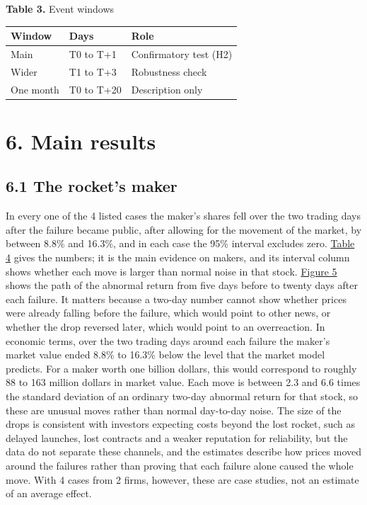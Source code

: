 \documentclass[12pt,a4paper]{article}
\begin{document}
\par\noindent\begin{minipage}{\textwidth}\hypertarget{tab-win}{}
\textbf{Table 3.} Event windows

{\small\setlength{\tabcolsep}{4pt}\begin{tabularx}{\textwidth}{llX}
\toprule
\textbf{Window} & \textbf{Days} & \textbf{Role} \\
\midrule
Main & T0 to T+1 & Confirmatory test (H2) \\
Wider & T\textminus{}1 to T+3 & Robustness check \\
One month & T0 to T+20 & Description only \\
\bottomrule
\end{tabularx}}
\vspace{6pt}

\end{minipage}\par\vspace{4pt}

\section*{\hypertarget{s6}{}6. Main results}
\subsection*{6.1 The rocket's maker}
In every one of the 4 listed cases the maker's shares fell over the two trading days after the failure became public, after allowing for the movement of the market, by between \textminus{}8.8\% and \textminus{}16.3\%, and in each case the 95\% interval excludes zero. \hyperlink{tab-case}{Table 4} gives the numbers; it is the main evidence on makers, and its interval column shows whether each move is larger than normal noise in that stock. \hyperlink{fig-paths}{Figure 5} shows the path of the abnormal return from five days before to twenty days after each failure. It matters because a two-day number cannot show whether prices were already falling before the failure, which would point to other news, or whether the drop reversed later, which would point to an overreaction. In economic terms, over the two trading days around each failure the maker's market value ended 8.8\% to 16.3\% below the level that the market model predicts. For a maker worth one billion dollars, this would correspond to roughly 88 to 163 million dollars in market value. Each move is between 2.3 and 6.6 times the standard deviation of an ordinary two-day abnormal return for that stock, so these are unusual moves rather than normal day-to-day noise. The size of the drops is consistent with investors expecting costs beyond the lost rocket, such as delayed launches, lost contracts and a weaker reputation for reliability, but the data do not separate these channels, and the estimates describe how prices moved around the failures rather than proving that each failure alone caused the whole move. With 4 cases from 2 firms, however, these are case studies, not an estimate of an average effect.
\end{document}
